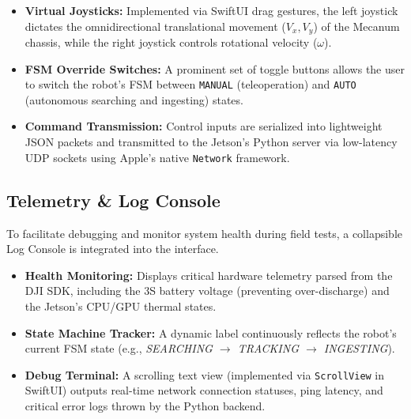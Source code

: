 \begin{itemize}
  \item \textbf{Virtual Joysticks:} Implemented via SwiftUI drag gestures, the left joystick dictates the omnidirectional translational movement ($V_x, V_y$) of the Mecanum chassis, while the right joystick controls rotational velocity ($\omega$). 

  \item \textbf{FSM Override Switches:} A prominent set of toggle buttons allows the user to switch the robot's FSM between \texttt{MANUAL} (teleoperation) and \texttt{AUTO} (autonomous searching and ingesting) states.

  \item \textbf{Command Transmission:} Control inputs are serialized into lightweight JSON packets and transmitted to the Jetson's Python server via low-latency UDP sockets using Apple's native \texttt{Network} framework.
\end{itemize}


\subsection{Telemetry \& Log Console}
\label{sec:log-window}
To facilitate debugging and monitor system health during field tests, a collapsible Log Console is integrated into the interface.

\begin{itemize}
  \item \textbf{Health Monitoring:} Displays critical hardware telemetry parsed from the DJI SDK, including the 3S battery voltage (preventing over-discharge) and the Jetson's CPU/GPU thermal states.

  \item \textbf{State Machine Tracker:} A dynamic label continuously reflects the robot's current FSM state (e.g., \textit{SEARCHING $\rightarrow$ TRACKING $\rightarrow$ INGESTING}).

  \item \textbf{Debug Terminal:} A scrolling text view (implemented via \texttt{ScrollView} in SwiftUI) outputs real-time network connection statuses, ping latency, and critical error logs thrown by the Python backend.
\end{itemize}